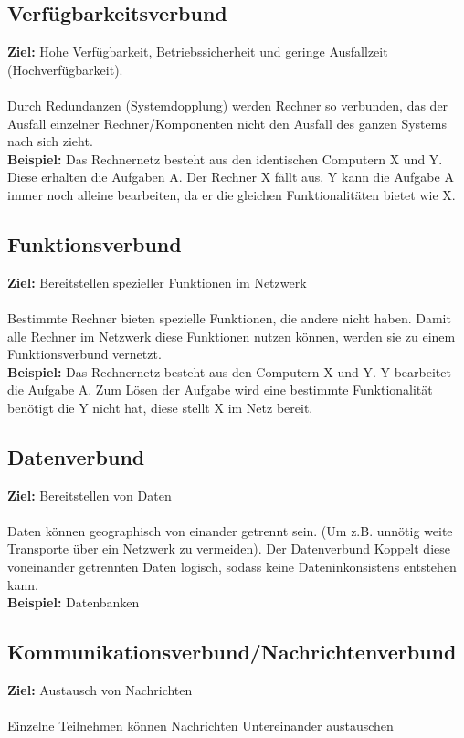 \documentclass[12pt,a4paper,oneside,german]{article}
\begin{document}
	\subsection{Verfügbarkeitsverbund}
		\textbf{Ziel:} Hohe Verfügbarkeit, Betriebssicherheit und geringe Ausfallzeit (Hochverfügbarkeit). \\\\
		Durch Redundanzen (Systemdopplung) werden Rechner so verbunden, das der Ausfall einzelner Rechner/Komponenten nicht den Ausfall des ganzen Systems nach sich zieht. \cite{Verfuegbarkeitsv}\\
		\textbf{Beispiel:} Das Rechnernetz besteht aus den identischen Computern X und Y. Diese erhalten die Aufgaben A.
		Der Rechner X fällt aus. Y kann die Aufgabe A immer noch alleine bearbeiten, da er die gleichen Funktionalitäten bietet wie X.
	
	\subsection{Funktionsverbund}
		\textbf{Ziel:} Bereitstellen spezieller Funktionen im Netzwerk\\\\
		Bestimmte Rechner bieten spezielle Funktionen, die andere nicht haben.
		Damit alle Rechner im Netzwerk diese Funktionen nutzen können, werden sie zu einem Funktionsverbund vernetzt.\cite{Funktionsv}\\
		\textbf{Beispiel:} Das Rechnernetz besteht aus den Computern X und Y. Y bearbeitet die Aufgabe A.
		Zum Lösen der Aufgabe wird eine bestimmte Funktionalität benötigt die Y nicht hat, diese stellt X im Netz bereit.
	\subsection{Datenverbund}
		\textbf{Ziel:} Bereitstellen von Daten \\\\
		Daten können geographisch von einander getrennt sein. (Um z.B. unnötig weite Transporte über ein Netzwerk zu vermeiden).
		Der Datenverbund Koppelt diese voneinander getrennten Daten logisch, sodass keine Dateninkonsistens entstehen kann.\\
		\textbf{Beispiel:} Datenbanken
	\subsection{Kommunikationsverbund/Nachrichtenverbund}
		\textbf{Ziel:} Austausch von Nachrichten \\\\
		Einzelne Teilnehmen können Nachrichten Untereinander austauschen
		
\end{document}
